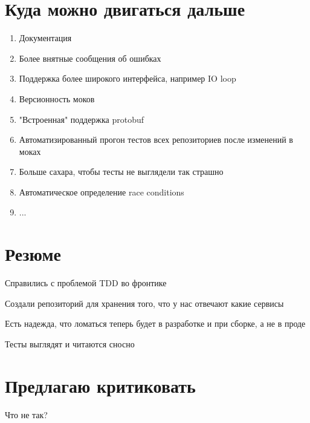 \documentclass[12pt]{article}
\begin{document}
\section{Куда можно двигаться дальше}

\begin{enumerate}
\Large \item Документация
\item \normalsize  Более внятные сообщения об ошибках
\item \small Поддержка более широкого интерфейса, например IO loop
\item \small Версионность моков
\item \footnotesize "Встроенная" поддержка protobuf
\item \tiny Автоматизированный прогон тестов всех репозиториев после изменений в моках
\item \scriptsize Больше сахара, чтобы тесты не выглядели так страшно
\item \scriptsize Автоматическое определение race conditions
\item \scriptsize ...

\end{enumerate}

\section{Резюме}

Справились с проблемой TDD во фронтике

Создали репозиторий для хранения того, что у нас отвечают какие сервисы

Есть надежда, что ломаться теперь будет в разработке и при сборке, а не в проде

Тесты выглядят и читаются сносно

\section{Предлагаю критиковать}
Что не так?
\end{document}
